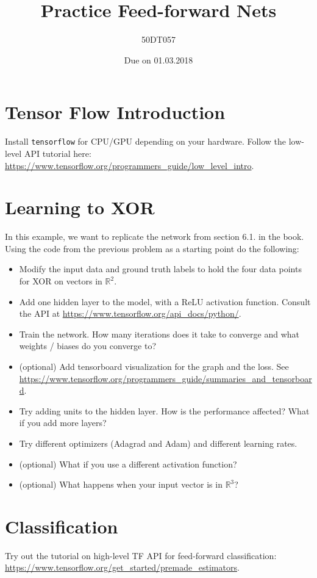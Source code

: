 \documentclass[savetrees,12pt]{article}
\begin{document}
\title{Practice Feed-forward Nets}
\author{50DT057}
\date{Due on 01.03.2018}
\maketitle

\section{Tensor Flow Introduction}
Install \verb+tensorflow+ for CPU/GPU depending on your hardware. Follow the low-level API tutorial here: \url{https://www.tensorflow.org/programmers_guide/low_level_intro}. 

\section{Learning to XOR}
In this example, we want to replicate the network from section 6.1. in the book. Using the code from the previous problem as a starting point do the following:
\begin{itemize}
\item Modify the input data and ground truth labels to hold the four data points for XOR on vectors in $\mathbb{R}^2$. 
\item Add one hidden layer to the model, with a ReLU activation function. Consult the API at \url{https://www.tensorflow.org/api_docs/python/}.
\item Train the network. How many iterations does it take to converge and what weights / biases do you converge to?
\item (optional) Add tensorboard visualization for the graph and the loss. See \url{https://www.tensorflow.org/programmers_guide/summaries_and_tensorboard}.
\item Try adding units to the hidden layer. How is the performance affected? What if you add more layers?
\item Try different optimizers (Adagrad and Adam) and different learning rates.
\item (optional) What if you use a different activation function?
\item (optional) What happens when your input vector is in $\mathbb{R}^3$?
\end{itemize}

\section{Classification}
Try out the tutorial on high-level TF API for feed-forward classification: \url{https://www.tensorflow.org/get_started/premade_estimators}.
\end{document}
